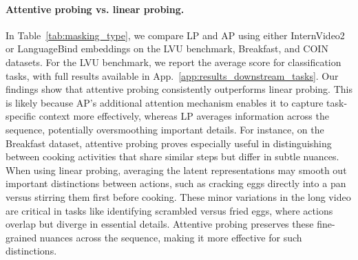 \paragraph{Attentive probing vs. linear probing.} In Table~\ref{tab:masking_type}, we compare LP and AP using either InternVideo2 or LanguageBind embeddings on the LVU benchmark, Breakfast, and COIN datasets. 
For the LVU benchmark, we report the average score for classification tasks, with full results available in App.~\ref{app:results_downstream_tasks}.
Our findings show that attentive probing consistently outperforms linear probing. This is likely because AP’s additional attention mechanism enables it to capture task-specific context more effectively, whereas LP averages information across the sequence, potentially oversmoothing important details.
For instance, on the Breakfast dataset, attentive probing proves especially useful in distinguishing between cooking activities that share similar steps but differ in subtle nuances.
When using linear probing, averaging the latent representations may smooth out important distinctions between actions, such as cracking eggs directly into a pan versus stirring them first before cooking. 
These minor variations in the long video are critical in tasks like identifying scrambled versus fried eggs, where actions overlap but diverge in essential details. 
Attentive probing preserves these fine-grained nuances across the sequence, making it more effective for such distinctions.


